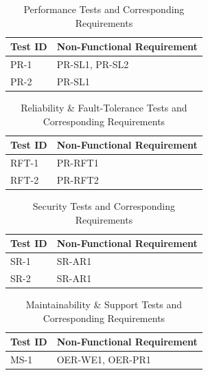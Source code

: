 \documentclass[12pt, titlepage]{article}
\begin{document}
\begin{table}[H]
  \centering
  \caption{Performance Tests and Corresponding Requirements}
  \label{tab:nfr-trace-perf}
  \begin{tabular}{>{\raggedright\arraybackslash}p{} >{\raggedright\arraybackslash}p{}}
    \toprule
    \textbf{Test ID} & \textbf{Non-Functional Requirement} \\
    \midrule
    PR-1 & PR-SL1, PR-SL2 \\
    PR-2 & PR-SL1 \\
    \bottomrule
  \end{tabular}
\end{table}

\begin{table}[H]
  \centering
  \caption{Reliability \& Fault-Tolerance Tests and Corresponding Requirements}
  \label{tab:nfr-trace-rft}
  \begin{tabular}{>{\raggedright\arraybackslash}p{} >{\raggedright\arraybackslash}p{}}
    \toprule
    \textbf{Test ID} & \textbf{Non-Functional Requirement} \\
    \midrule
    RFT-1 & PR-RFT1 \\
    RFT-2 & PR-RFT2 \\
    \bottomrule
  \end{tabular}
\end{table}

\begin{table}[H]
  \centering
  \caption{Security Tests and Corresponding Requirements}
  \label{tab:nfr-trace-sec}
  \begin{tabular}{>{\raggedright\arraybackslash}p{} >{\raggedright\arraybackslash}p{}}
    \toprule
    \textbf{Test ID} & \textbf{Non-Functional Requirement} \\
    \midrule
    SR-1 & SR-AR1 \\
    SR-2 & SR-AR1 \\
    \bottomrule
  \end{tabular}
\end{table}

\begin{table}[H]
  \centering
  \caption{Maintainability \& Support Tests and Corresponding Requirements}
  \label{tab:nfr-trace-ms}
  \begin{tabular}{>{\raggedright\arraybackslash}p{} >{\raggedright\arraybackslash}p{}}
    \toprule
    \textbf{Test ID} & \textbf{Non-Functional Requirement} \\
    \midrule
    MS-1 & OER-WE1, OER-PR1 \\
    \bottomrule
  \end{tabular}
\end{table}
\end{document}
